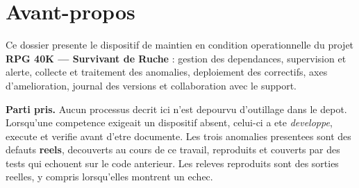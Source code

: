 \documentclass[11pt,a4paper,oneside]{article}
\begin{document}
\section*{Avant-propos}

Ce dossier presente le dispositif de maintien en condition operationnelle du projet
\textbf{RPG 40K --- Survivant de Ruche} : gestion des dependances, supervision et alerte,
collecte et traitement des anomalies, deploiement des correctifs, axes d'amelioration, journal
des versions et collaboration avec le support.

\textbf{Parti pris.} Aucun processus decrit ici n'est depourvu d'outillage dans le depot. Lorsqu'une
competence exigeait un dispositif absent, celui-ci a ete \emph{developpe}, execute et verifie avant
d'etre documente. Les trois anomalies presentees sont des defauts \textbf{reels}, decouverts au
cours de ce travail, reproduits et couverts par des tests qui echouent sur le code anterieur.
Les releves reproduits sont des sorties reelles, y compris lorsqu'elles montrent un echec.
\end{document}
